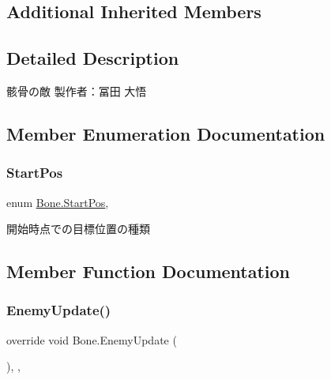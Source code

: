 \subsection*{Additional Inherited Members}


\subsection{Detailed Description}
骸骨の敵 製作者：冨田 大悟 



\subsection{Member Enumeration Documentation}
\mbox{\label{class_bone_a4e9643808aa3b00b96fcd597c46f00b1}} 
\subsubsection{\texorpdfstring{Start\+Pos}{StartPos}}
{\footnotesize\ttfamily enum \hyperlink{class_bone_a4e9643808aa3b00b96fcd597c46f00b1}{Bone.\+Start\+Pos}\hspace{0.3cm}{\ttfamily [strong]}, {\ttfamily [private]}}



開始時点での目標位置の種類 



\subsection{Member Function Documentation}
\mbox{\label{class_bone_ae81be60a677bf474ff4634cea32921dc}} 
\subsubsection{\texorpdfstring{Enemy\+Update()}{EnemyUpdate()}}
{\footnotesize\ttfamily override void Bone.\+Enemy\+Update (\begin{DoxyParamCaption}{ }\end{DoxyParamCaption})\hspace{0.3cm}{\ttfamily [inline]}, {\ttfamily [protected]}, {\ttfamily [virtual]}}



